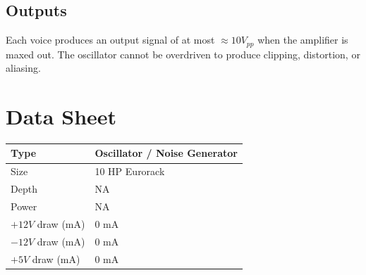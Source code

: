 \documentclass[12pt,letter]{article}
\begin{document}
\subsection{Outputs}

Each voice produces an output signal of at most ${\approx}10V_{pp}$ when the
amplifier is maxed out. The oscillator cannot be overdriven to produce
clipping, distortion, or aliasing.


\clearpage
\section*{Data Sheet}

\begin{table}[!htp]
\begin{tabular}{|l|l|}
\hline
Type             & Oscillator / Noise Generator  \\
\hline
Size             & 10 HP Eurorack           \\
\hline
Depth            & NA                       \\
\hline
Power            & NA                       \\ %
\hline
$+12V$ draw (mA) & 0 mA                     \\
\hline
$-12V$ draw (mA) & 0 mA                     \\
\hline
$+5V$ draw (mA)  & 0 mA                     \\
\hline
\end{tabular}
\end{table}


\clearpage
\renewcommand\refname{References \& Acknowledgments}
\nocite{*}


\end{document}
